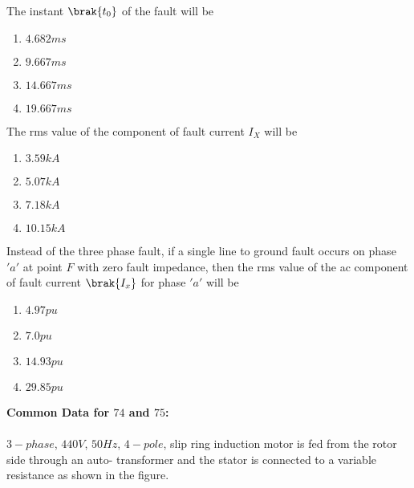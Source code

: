 \item The instant $\brak{t_0}$ of the fault will be 
\begin{enumerate}
    \item $4.682 ms$
    \item $9.667 ms$
    \item $14.667 ms$
    \item $19.667 ms$
\end{enumerate}
\item The rms value of the component of fault current $I_X$ will be 
\begin{enumerate}
    \item $3.59kA$ 
    \item $5.07kA$
    \item $7.18kA$
    \item $10.15kA$
\end{enumerate}
\item Instead of the three phase fault, if a single line to ground fault occurs on phase $'a'$ at point $F$ with zero fault impedance, then the rms value of the ac component of fault current $\brak{I_x}$ for phase $'a'$ will be
\begin{enumerate}
    \item $4.97 pu$
    \item $7.0 pu$
    \item $14.93 pu$
    \item $29.85 pu$
\end{enumerate}
 \textbf{Common Data for $74$ and $75$:}\\\\
$3-phase$, $440 V$, $50 Hz$, $4-pole$, slip ring induction motor is fed from the rotor side through an auto- transformer and the stator is connected to a variable resistance as shown in the figure.\\\\\\\\\\\\\\\\

